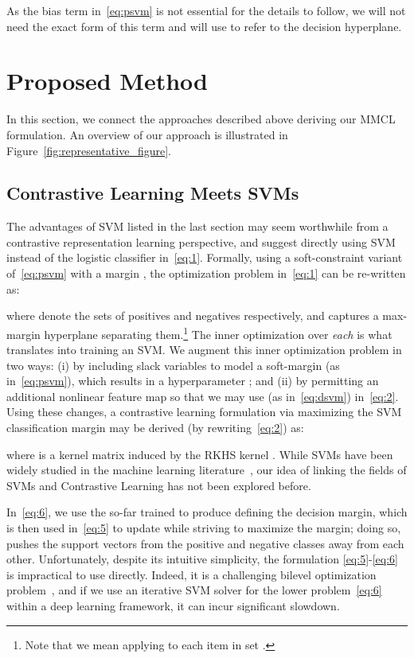 \documentclass[letterpaper]{article} \usepackage{aaai22}  \usepackage{times}  \usepackage{helvet}  \usepackage{courier}  \usepackage[hyphens]{url}  \usepackage{graphicx} \urlstyle{rm} \def\UrlFont{\rm}  \usepackage{natbib}  \usepackage{caption} \DeclareCaptionStyle{ruled}{labelfont=normalfont,labelsep=colon,strut=off} \frenchspacing  \setlength{\pdfpagewidth}{8.5in}  \setlength{\pdfpageheight}{11in}
\begin{document}
As the bias term  in~\eqref{eq:psvm} is not essential for the details to follow, we will not need the exact form of this term and will use  to refer to the decision hyperplane.

\section{Proposed Method}
In this section, we connect the approaches described above deriving our MMCL formulation. An overview of our approach is illustrated in Figure~\ref{fig:representative_figure}.

\subsection{Contrastive Learning Meets SVMs}
The advantages of SVM listed in the last section may seem worthwhile from a contrastive representation learning perspective, and suggest directly using SVM instead of the logistic classifier in~\eqref{eq:1}. Formally, using a soft-constraint variant of~\eqref{eq:psvm} with a margin , the optimization problem in~\eqref{eq:1} can be re-written as:

where  denote the sets of positives and negatives respectively, and  captures a max-margin hyperplane separating them.\footnote{Note that  we mean applying  to each item in set .} The inner optimization over \emph{each}  is what translates into training an SVM. We augment this inner optimization problem in two ways: (i) by including slack variables to model a soft-margin (as in~\eqref{eq:psvm}), which results in a hyperparameter ; and (ii) by permitting an additional nonlinear feature map  so that we may use  (as in~\eqref{eq:dsvm}) in~\eqref{eq:2}. Using these changes, a contrastive learning formulation via maximizing the SVM classification margin may be derived (by rewriting~\eqref{eq:2}) as:


where 
is a kernel matrix induced by the RKHS kernel . While SVMs have been widely studied in the machine learning literature~\cite{smola1998learning,cortes1995support}, our idea of linking the fields of SVMs and Contrastive Learning has not been explored before.

In~\eqref{eq:6}, we use the so-far trained  to produce  defining the decision margin, which is then used in~\eqref{eq:5} to update  while striving to maximize the margin; doing so, pushes the support vectors from the positive and negative classes away from each other. Unfortunately, despite its intuitive simplicity, the formulation \eqref{eq:5}-\eqref{eq:6} is impractical to use directly. Indeed, it is a challenging bilevel optimization problem~\cite{gould2016differentiating,amos2017optnet,wang2018video}, and if we use an iterative SVM solver for the lower problem~\eqref{eq:6} within a deep learning framework, it can incur significant slowdown. 
\end{document}
